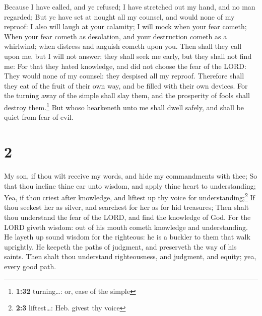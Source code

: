  Because I have called, and ye refused; I have stretched
out my hand, and no man regarded;  But ye have set at
nought all my counsel, and would none of my reproof:  I
also will laugh at your calamity; I will mock when your fear cometh;
 When your fear cometh as desolation, and your
destruction cometh as a whirlwind; when distress and anguish cometh upon
you.  Then shall they call upon me, but I will not
answer; they shall seek me early, but they shall not find me:
 For that they hated knowledge, and did not choose the
fear of the LORD:  They would none of my counsel: they
despised all my reproof.  Therefore shall they eat of the
fruit of their own way, and be filled with their own devices.
 For the turning away of the simple shall slay them, and
the prosperity of fools shall destroy them.\footnote{\textbf{1:32}
  turning\ldots: or, ease of the simple}  But whoso
hearkeneth unto me shall dwell safely, and shall be quiet from fear of
evil.

\hypertarget{section-1}{%
\section{2}\label{section-1}}

 My son, if thou wilt receive my words, and hide my
commandments with thee;  So that thou incline thine ear
unto wisdom, and apply thine heart to understanding;  Yea,
if thou criest after knowledge, and liftest up thy voice for
understanding;\footnote{\textbf{2:3} liftest\ldots: Heb. givest thy
  voice}  If thou seekest her as silver, and searchest for
her as for hid treasures;  Then shalt thou understand the
fear of the LORD, and find the knowledge of God.  For the
LORD giveth wisdom: out of his mouth cometh knowledge and understanding.
 He layeth up sound wisdom for the righteous: he is a
buckler to them that walk uprightly.  He keepeth the paths
of judgment, and preserveth the way of his saints.  Then
shalt thou understand righteousness, and judgment, and equity; yea,
every good path.

